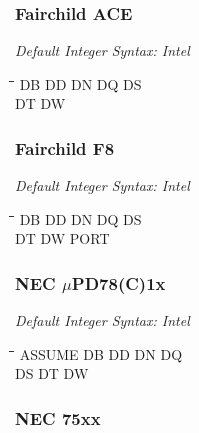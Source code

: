 \subsubsection{Fairchild ACE}

{\em Default Integer Syntax: Intel}

{\tt\begin{tabbing}
\hspace{3cm}\=\hspace{3cm}\=\hspace{3cm}\=\hspace{3cm}\=\kill
DB          \> DD          \> DN         \> DQ          \> DS \\
DT          \> DW \\
\end{tabbing}}

\subsubsection{Fairchild F8}

{\em Default Integer Syntax: Intel}

{\tt\begin{tabbing}
\hspace{3cm}\=\hspace{3cm}\=\hspace{3cm}\=\hspace{3cm}\=\kill
DB          \> DD          \> DN         \> DQ          \> DS \\
DT          \> DW          \> PORT \\
\end{tabbing}}

\subsubsection{NEC $\mu$PD78(C)1x}

{\em Default Integer Syntax: Intel}

{\tt\begin{tabbing}
\hspace{3cm}\=\hspace{3cm}\=\hspace{3cm}\=\hspace{3cm}\=\kill
ASSUME     \> DB          \> DD          \> DN          \> DQ \\
DS         \> DT          \> DW \\
\end{tabbing}}

\subsubsection{NEC 75xx}

